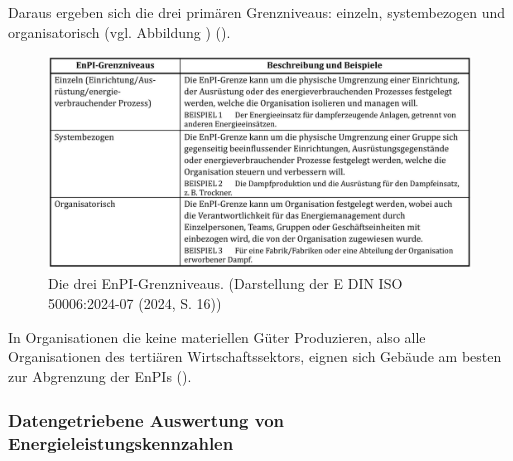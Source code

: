 Daraus ergeben sich die drei primären Grenzniveaus: einzeln, systembezogen und organisatorisch (vgl. Abbildung ) (\cite[Kapitel 5.3]{DIN50006.2024}). 
\begin{figure}[H]
    \centering
    \includegraphics[width=1\textwidth]{../../Ressourcen/Abbildungen/EnPI_Grenzniveaus_ISO_50006.jpg}
    \caption{Die drei EnPI-Grenzniveaus. (Darstellung der E DIN ISO 50006:2024-07 (2024, S. 16))}
    \label{fig:EnPI_Grenzniveaus}
\end{figure}
In Organisationen die keine materiellen Güter Produzieren, also alle Organisationen des tertiären Wirtschaftssektors, eignen sich Gebäude am besten zur 
Abgrenzung der EnPIs (\cite[S. 9]{Fichera.2020}).

\subsubsection{Datengetriebene Auswertung von Energieleistungskennzahlen}